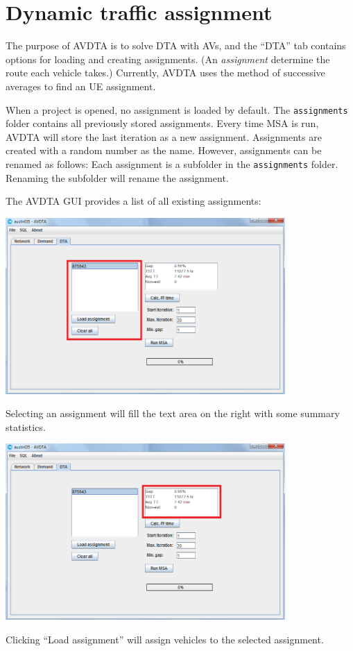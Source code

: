 \chapter{Dynamic traffic assignment}

The purpose of AVDTA is to solve DTA with AVs, and the ``DTA'' tab contains options for loading and creating assignments. (An \textit{assignment} determine the route each vehicle takes.) Currently, AVDTA uses the method of successive averages to find an UE assignment. 

When a project is opened, no assignment is loaded by default. The \texttt{assignments} folder contains all previously stored assignments. Every time MSA is run, AVDTA will store the last iteration as a new assignment. Assignments are created with a random number as the name. However, assignments can be renamed as follows: Each assignment is a subfolder in the \texttt{assignments} folder. Renaming the subfolder will rename the assignment.

The AVDTA GUI provides a list of all existing assignments:
\begin{center}
\includegraphics[width=0.8\textwidth]{images/msa2.png}
\end{center}
Selecting an assignment will fill the text area on the right with some summary statistics.
\begin{center}
\includegraphics[width=0.8\textwidth]{images/msa3.png}
\end{center}
Clicking ``Load assignment'' will assign vehicles to the selected assignment.

